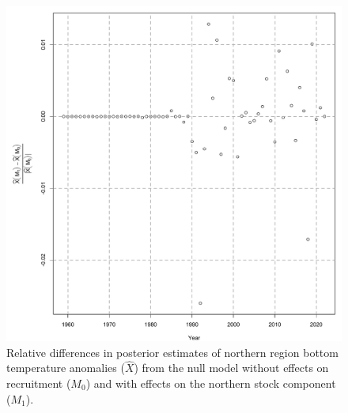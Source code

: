 \documentclass[
]{article}
\begin{document}
\begin{figure}

{\centering \includegraphics[height=0.95\textheight]{Ecov_M1_rel_M0} 

}

\caption{Relative differences in posterior estimates of northern region bottom temperature anomalies ($\widehat X$) from the null model without effects on recruitment ($M_0$) and with effects on the northern stock component ($M_1$).}\label{fig:Ecov-M1-rel-M0}
\end{figure}

\pagebreak
\end{document}
